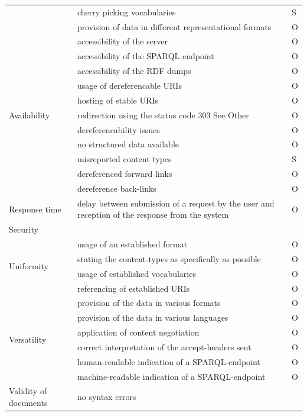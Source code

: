 \begin{longtable}{ | p{3cm} | p{10cm} | >{\centering\arraybackslash}p{2cm}| }
\cline{2-3}
& cherry picking vocabularies & S\\
\cline{2-3}
& provision of data in different representational formats & O\\
\hline
\multirow{11}{*}{Availability} & accessibility of the server & O\\
\cline{2-3}
& accessibility of the SPARQL endpoint & O\\
\cline{2-3}
& accessibility of the RDF dumps & O\\
\cline{2-3}
& usage of dereferencable URIs & O\\
\cline{2-3}
& hosting of stable URIs & O\\
\cline{2-3}
& redirection using the status code 303 See Other & O\\
\cline{2-3}
& dereferencability issues & O\\
\cline{2-3}
& no structured data available & O\\
\cline{2-3}
& misreported content types & S\\
\cline{2-3}
& dereferenced forward links & O\\
\cline{2-3}
& dereference back-links & O\\
\hline
Response time & delay between submission of a request by the user and reception of the response from the system & O\\
\hline
Security & & \\
\hline
\multirow{4}{*}{Uniformity} & usage of an established format & O\\
\cline{2-3}
& stating the content-types as specifically as possible & O\\
\cline{2-3}
& usage of established vocabularies & O\\
\cline{2-3}
& referencing of established URIs  & O\\
\hline
\multirow{6}{*}{Versatility} & provision of the data in various formats & O\\
\cline{2-3}
& provision of the data in various languages & O\\
\cline{2-3}
& application of content negotiation & O\\
\cline{2-3}
& correct interpretation of the accept-headers sent & O\\
\cline{2-3}
& human-readable indication of a SPARQL-endpoint & O\\
\cline{2-3}
& machine-readable indication of a SPARQL-endpoint & O\\
\hline
\multirow{4}{*}{Validity of documents} & no syntax errors & \\

\end{longtable}
